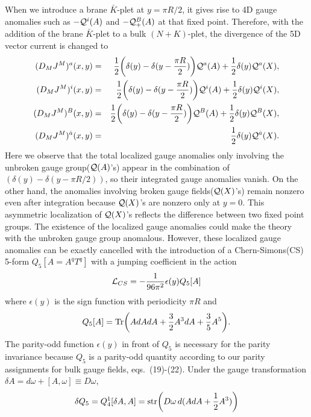 \documentclass[a4paper,12pt]{article}
\begin{document}
When we introduce a brane $\bar K$-plet at $y=\pi R/2$, it gives rise to 4D
gauge anomalies such as $-{\cal Q}^i(A)$ and $-{\cal Q}^B_+(A)$ at that fixed 
point. Therefore, with the addition of the brane $\bar K$-plet to a bulk 
$(N+K)$-plet, the divergence of the 5D vector current is changed to
\begin{eqnarray}
(D_M J^{M})^a(x,y)&=&\frac{1}{2}\bigg(\delta(y)-\delta(y-\frac{\pi R}{2})\bigg)
{\cal Q}^a(A)+\frac{1}{2}\delta(y){\cal Q}^a(X), \label{bbanomaly1}\\
(D_M J^{M})^i(x,y)&=&\frac{1}{2}\bigg(\delta(y)-\delta(y-\frac{\pi R}{2})\bigg)
{\cal Q}^i(A)+\frac{1}{2}\delta(y){\cal Q}^i(X), \label{bbanomaly2}\\
(D_M J^{M})^B(x,y)&=&\frac{1}{2}\bigg(\delta(y)-\delta(y-\frac{\pi R}{2})\bigg)
{\cal Q}^B(A)
+\frac{1}{2}\delta(y){\cal Q}^B(X), \label{bbanomaly3}\\
(D_M J^{M})^{\hat a}(x,y)&=&\frac{1}{2}\delta(y)
{\cal Q}^{\hat a}(X) \label{bbanomaly4}.
\end{eqnarray}
Here we observe that the total localized gauge anomalies only involving
the unbroken gauge group(${\cal Q}(A)$'s) appear 
in the combination of $(\delta(y)-\delta(y-\pi R/2))$, so their integrated
gauge anomalies vanish. 
On the other hand, the anomalies involving 
broken gauge fields(${\cal Q}(X)$'s) 
remain nonzero even after integration because ${\cal Q}(X)$'s 
are nonzero only at $y=0$. This asymmetric localization of  
${\cal Q}(X)$'s reflects the difference between two fixed point groups. 
The existence of the localized gauge anomalies could make the theory with
the unbroken gauge group anomalous.  
However, these localized gauge anomalies can be 
exactly cancelled with the introduction of a Chern-Simons(CS) 5-form 
$Q_5[A=A^q T^q]$ with a jumping coefficient in the action\cite{kkl} 
\begin{eqnarray}
{\cal L}_{CS}=-\frac{1}{96\pi^2}\epsilon(y)Q_5[A]
\end{eqnarray}  
where $\epsilon(y)$ is the sign function with periodicity $\pi R$ and 
\begin{eqnarray}
Q_5[A]={\rm Tr}\bigg(AdAdA+\frac{3}{2}A^3 dA+\frac{3}{5}A^5\bigg).
\end{eqnarray}
The parity-odd function $\epsilon(y)$ in front of $Q_5$ is necessary 
for the parity invariance because
$Q_5$ is a parity-odd quantity according to our parity assignments for bulk
gauge fields, eqs.~(19)-(22). 
Under the gauge transformation 
$\delta A=d\omega+[A,\omega]\equiv D\omega$, 
\begin{eqnarray}
\delta Q_5=Q^1_4[\delta A,A]={\rm str}
\bigg(D\omega \,d(AdA+\frac{1}{2}A^3)\bigg)
\end{eqnarray}
\end{document}
